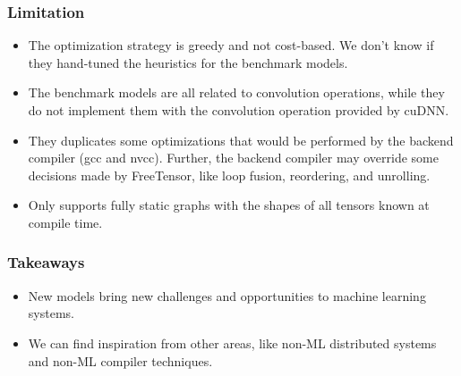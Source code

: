\documentclass[12pt,aspectratio=169]{beamer}
\begin{document}
    \begin{frame}
        \frametitle{Limitation}

        \begin{itemize}
            \setlength{\itemsep}{.8em}
            \item The optimization strategy is greedy and not cost-based. We don't know if they hand-tuned the heuristics for the benchmark models.
            \item The benchmark models are all related to convolution operations, while they do not implement them with the convolution operation provided by cuDNN.
            \item They duplicates some optimizations that would be performed by the backend compiler (gcc and nvcc). Further, the backend compiler may override some decisions made by FreeTensor, like loop fusion, reordering, and unrolling.
            \item Only supports fully static graphs with the shapes of all tensors known at compile time.
        \end{itemize}
    \end{frame}

    \begin{frame}
        \frametitle{Takeaways}

        \begin{itemize}
            \setlength{\itemsep}{.8em}
            \item New models bring new challenges and opportunities to machine learning systems.
            \item We can find inspiration from other areas, like non-ML distributed systems and non-ML compiler techniques.
        \end{itemize}
    \end{frame}

    \appendix

\end{document}
